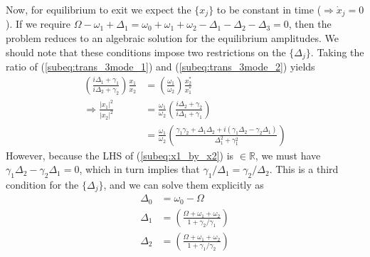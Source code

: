 Now, for equilibrium to exit we expect the $\{x_j\}$ to be constant in time ($\Rightarrow \dot{x}_j = 0$). If we require $\Omega - \omega_1 + \Delta_1 = \omega_0 + \omega_1 + \omega_2 - \Delta_1 - \Delta_2 - \Delta_3 = 0$, then the problem reduces to an algebraic solution for the equilibrium amplitudes. We should note that these conditions impose two restrictions on the $\{\Delta_j\}$. Taking the ratio of (\ref{subeq:trans_3mode_1}) and (\ref{subeq:trans_3mode_2}) yields
\begin{subequations}
\begin{align}
\left(\frac{i\Delta_1 + \gamma_1}{i\Delta_2 + \gamma_2}\right) \frac{x_1}{x_2} & = \left(\frac{\omega_1}{\omega_2}\right)\frac{x_2^\ast}{x_1^\ast} \\
\Rightarrow \frac{|x_1|^2}{|x_2|^2} & = \frac{\omega_1}{\omega_2}\left(\frac{i\Delta_2 + \gamma_2}{i\Delta_1 + \gamma_1}\right) \\
                                    & = \frac{\omega_1}{\omega_2}\left(\frac{\gamma_1\gamma_2 + \Delta_1\Delta_2 + i(\gamma_1\Delta_2 - \gamma_2\Delta_1)}{\Delta_1^2 + \gamma_1^2}\right) \label{subeq:x1_by_x2}
\end{align}
\end{subequations}
However, because the LHS of (\ref{subeq:x1_by_x2}) is $\in \mathbb{R}$, we must have $\gamma_1\Delta_2 - \gamma_2\Delta_1 = 0$, which in turn implies that $\gamma_1/\Delta_1 = \gamma_2/\Delta_2$. This is a third condition for the $\{\Delta_j\}$, and we can solve them explicitly as
\begin{subequations}\label{eq:Deltas}
\begin{align}
\Delta_0 & = \omega_0 -\Omega \\
\Delta_1 & = \left(\frac{\Omega + \omega_1 + \omega_2}{1 + \gamma_2/\gamma_1}\right) \\
\Delta_2 & = \left(\frac{\Omega + \omega_1 + \omega_2}{1 + \gamma_1/\gamma_2}\right)
\end{align}
\end{subequations}

